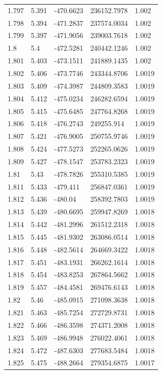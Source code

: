 \begin{tabular}{lllll}
1.797 & 5.391 & -470.6623 & 236152.7978 & 1.002 \\
1.798 & 5.394 & -471.2837 & 237574.0034 & 1.002 \\
1.799 & 5.397 & -471.9056 & 239003.7618 & 1.002 \\
1.8 & 5.4 & -472.5281 & 240442.1246 & 1.002 \\
1.801 & 5.403 & -473.1511 & 241889.1435 & 1.002 \\
1.802 & 5.406 & -473.7746 & 243344.8706 & 1.0019 \\
1.803 & 5.409 & -474.3987 & 244809.3583 & 1.0019 \\
1.804 & 5.412 & -475.0234 & 246282.6594 & 1.0019 \\
1.805 & 5.415 & -475.6485 & 247764.8268 & 1.0019 \\
1.806 & 5.418 & -476.2743 & 249255.914 & 1.0019 \\
1.807 & 5.421 & -476.9005 & 250755.9746 & 1.0019 \\
1.808 & 5.424 & -477.5273 & 252265.0626 & 1.0019 \\
1.809 & 5.427 & -478.1547 & 253783.2323 & 1.0019 \\
1.81 & 5.43 & -478.7826 & 255310.5385 & 1.0019 \\
1.811 & 5.433 & -479.411 & 256847.0361 & 1.0019 \\
1.812 & 5.436 & -480.04 & 258392.7803 & 1.0019 \\
1.813 & 5.439 & -480.6695 & 259947.8269 & 1.0018 \\
1.814 & 5.442 & -481.2996 & 261512.2318 & 1.0018 \\
1.815 & 5.445 & -481.9302 & 263086.0514 & 1.0018 \\
1.816 & 5.448 & -482.5614 & 264669.3422 & 1.0018 \\
1.817 & 5.451 & -483.1931 & 266262.1614 & 1.0018 \\
1.818 & 5.454 & -483.8253 & 267864.5662 & 1.0018 \\
1.819 & 5.457 & -484.4581 & 269476.6143 & 1.0018 \\
1.82 & 5.46 & -485.0915 & 271098.3638 & 1.0018 \\
1.821 & 5.463 & -485.7254 & 272729.8731 & 1.0018 \\
1.822 & 5.466 & -486.3598 & 274371.2008 & 1.0018 \\
1.823 & 5.469 & -486.9948 & 276022.4061 & 1.0018 \\
1.824 & 5.472 & -487.6303 & 277683.5484 & 1.0018 \\
1.825 & 5.475 & -488.2664 & 279354.6875 & 1.0017 \\

\end{tabular}
